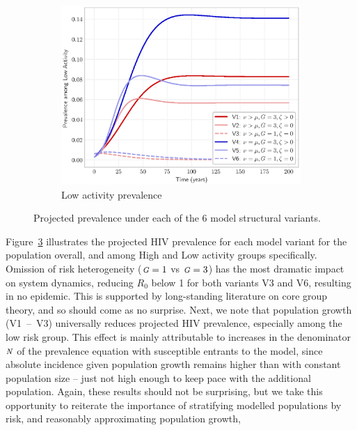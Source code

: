 \documentclass[10pt]{article}
\newlength{\figi}  \setlength{\figi}  {0.800\textwidth}
\newlength{\figii} \setlength{\figii} {0.490\textwidth}
\newlength{\figiii}\setlength{\figiii}{0.325\textwidth}
\numberwithin{equation}{section}
\newcommand{\N}{{\mbox{\footnotesize{\textit{N}}}}}
\newcommand{\G}{{\mbox{\footnotesize{\textit{G}}}}}
\newcommand{\fig}[1]{Figure~\ref{#1}}
\begin{document}
\begin{figure}
\begin{subfigure}{\figiii}
    \label{fig:prevalence-variants-high}
  \end{subfigure}
  \begin{subfigure}{\figiii} %
    \includegraphics[width=\textwidth]{prevalence-low-compare.eps}
    \caption{Low activity prevalence}
    \label{fig:prevalence-variants-low}
  \end{subfigure}
  \caption{Projected prevalence under each of the 6 model structural variants.}
  \label{fig:prevalence-variants}
\end{figure}
\fig{fig:prevalence-variants} illustrates
the projected HIV prevalence for each model variant
for the population overall, and among High and Low activity groups specifically.
Omission of risk heterogeneity ($\G = 1$ vs $\G = 3$)
has the most dramatic impact on system dynamics,
reducing $R_0$ below 1 for both variants V3 and V6, resulting in no epidemic.
This is supported by long-standing literature on core group theory,
and so should come as no surprise.
Next, we note that population growth (V1~--~V3) universally reduces projected HIV prevalence,
especially among the low risk group.
This effect is mainly attributable to
increases in the denominator $\N$ of the prevalence equation
with susceptible entrants to the model,
since absolute incidence given population growth
remains higher than with constant population size
-- just not high enough to keep pace with the additional population.
Again, these results should not be surprising,
but we take this opportunity to reiterate the importance of
stratifying modelled populations by risk,
and reasonably approximating population growth,
\end{document}
